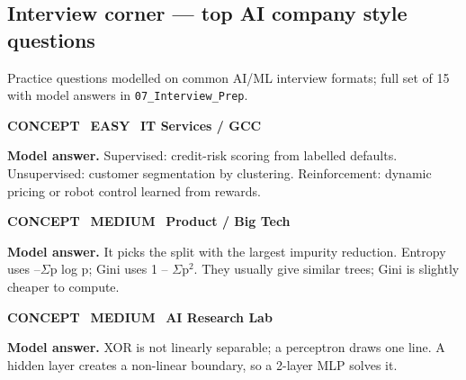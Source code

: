 \subsection*{Interview corner --- top AI company style questions}
{\small\color{slate}Practice questions modelled on common AI/ML interview formats; full set of 15 with model answers in \texttt{07\_Interview\_Prep}.}
\begin{tcolorbox}[enhanced,breakable,colback=white,colframe=teal,arc=2mm,boxrule=0.8pt,left=3mm,right=3mm,
 title={\textbf{QV.01}\quad Explain supervised, unsupervised and reinforcement learning with one industry example each.},fonttitle=\color{white}\small,colbacktitle=teal]
\colorbox{teal!15}{\scriptsize\bfseries\color{teal} CONCEPT}\
\colorbox{leaf!15}{\scriptsize\bfseries\color{leaf} EASY}\
\colorbox{navy!8}{\scriptsize\bfseries\color{navy} IT Services / GCC}\par\smallskip
\textbf{\color{navy}Model answer.} Supervised: credit-risk scoring from labelled defaults. Unsupervised: customer segmentation by clustering. Reinforcement: dynamic pricing or robot control learned from rewards.
\end{tcolorbox}
\begin{tcolorbox}[enhanced,breakable,colback=white,colframe=teal,arc=2mm,boxrule=0.8pt,left=3mm,right=3mm,
 title={\textbf{QV.02}\quad How does a decision tree choose a split? Compare entropy and Gini.},fonttitle=\color{white}\small,colbacktitle=teal]
\colorbox{teal!15}{\scriptsize\bfseries\color{teal} CONCEPT}\
\colorbox{gold!85!black!15}{\scriptsize\bfseries\color{gold!85!black} MEDIUM}\
\colorbox{navy!8}{\scriptsize\bfseries\color{navy} Product / Big Tech}\par\smallskip
\textbf{\color{navy}Model answer.} It picks the split with the largest impurity reduction. Entropy uses --$\Sigma$p log p; Gini uses 1 -- $\Sigma$p$^2$. They usually give similar trees; Gini is slightly cheaper to compute.
\end{tcolorbox}
\begin{tcolorbox}[enhanced,breakable,colback=white,colframe=teal,arc=2mm,boxrule=0.8pt,left=3mm,right=3mm,
 title={\textbf{QV.03}\quad Why can't a single perceptron learn XOR?},fonttitle=\color{white}\small,colbacktitle=teal]
\colorbox{teal!15}{\scriptsize\bfseries\color{teal} CONCEPT}\
\colorbox{gold!85!black!15}{\scriptsize\bfseries\color{gold!85!black} MEDIUM}\
\colorbox{navy!8}{\scriptsize\bfseries\color{navy} AI Research Lab}\par\smallskip
\textbf{\color{navy}Model answer.} XOR is not linearly separable; a perceptron draws one line. A hidden layer creates a non-linear boundary, so a 2-layer MLP solves it.
\end{tcolorbox}
